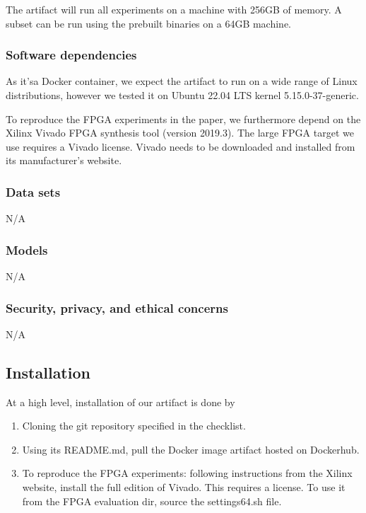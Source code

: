 \documentclass[letterpaper,twocolumn,10pt]{article}
\begin{document}
{The artifact will run all experiments on a machine with 256GB of memory. A subset can be run using the prebuilt binaries on a 64GB machine.

\subsubsection{Software dependencies}

As it'sa Docker container, we expect the artifact to run on a wide range
of Linux distributions, however we tested it on Ubuntu 22.04 LTS kernel
5.15.0-37-generic.

To reproduce the FPGA experiments in the paper, we furthermore depend
on the Xilinx Vivado FPGA synthesis tool (version 2019.3).  The large
FPGA target we use requires a Vivado license. Vivado needs to be downloaded
and installed from its manufacturer's website.

\subsubsection{Data sets}

N/A

\subsubsection{Models}

N/A

\subsubsection{Security, privacy, and ethical concerns}

N/A

\subsection{Installation}

At a high level, installation of our artifact is done by
\begin{enumerate}
    \item Cloning the git repository specified in the checklist.
    \item Using its README.md, pull the Docker image artifact
        hosted on Dockerhub.
    \item To reproduce the FPGA experiments: following instructions
        from the Xilinx website, install the full edition of Vivado.
        This requires a license. To use it from the \ourname
        FPGA evaluation dir, source the settings64.sh
        file.
\end{enumerate}

}
\end{document}
